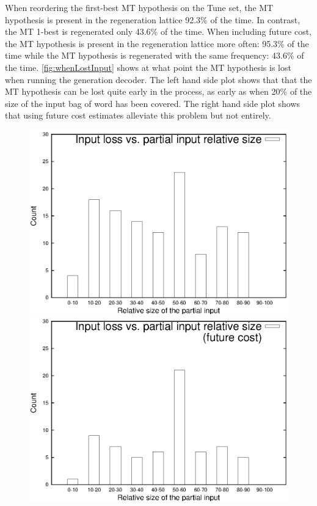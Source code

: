 When reordering the first-best MT hypothesis on the Tune set,
the MT hypothesis is present in the regeneration lattice
92.3\% of the time. In contrast, the MT 1-best is regenerated
only 43.6\% of the time. When including future cost, the MT
hypothesis is present in the regeneration lattice
more often: 95.3\% of the time while the MT hypothesis is regenerated
with the same frequency: 43.6\% of the time.
\autoref{fig:whenLostInput} shows at what point the MT hypothesis is lost
when running the generation decoder. The left hand side plot shows that
that the MT hypothesis can be lost quite early in the process, as early as
when 20\% of the size of the input bag of word has been covered. The right
hand side plot shows that using future cost estimates alleviate this problem
but not entirely.
%
\begin{figure}
\begin{center}
\begin{minipage}{.45\textwidth}
  \includegraphics[scale = 0.6]{figures/whenLostInput/Tune.text.nw.v3x08.1stpass.10best.exp.allrules.mmap.nbest1000.1.whenlostinput.eps}
\end{minipage} 
\hfill
\begin{minipage}{.45\textwidth}
  \includegraphics[scale = 0.6]{figures/whenLostInput/Tune.text.nw.v3x08.1stpass.10best.exp.allrules.mmap.nbest1000.1.futurecost.whenlostinput.eps}

\end{minipage}
\end{center}
\end{figure}
